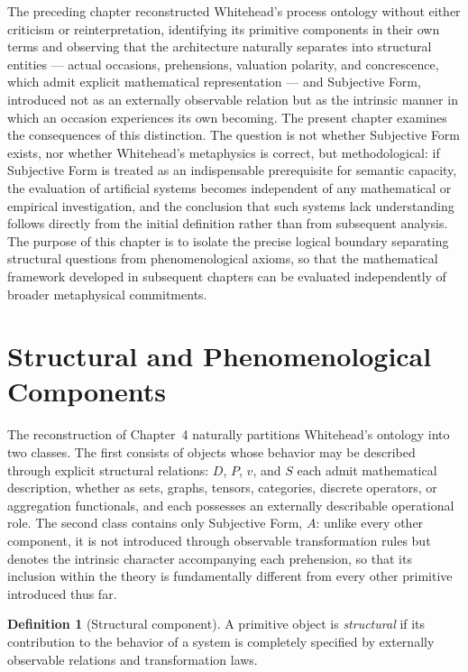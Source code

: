 \documentclass[11pt,twoside,openright]{book}
\numberwithin{equation}{chapter}
\theoremstyle{definition}
\newtheorem{definition}{Definition}[chapter]
\theoremstyle{plain}
\theoremstyle{remark}
\theoremstyle{definition}
\newcommand{\WData}{D}
\newcommand{\WPrehensions}{P}
\newcommand{\WValuation}{v}
\newcommand{\WSatisfaction}{S}
\newcommand{\WSubjForm}{A}
\begin{document}
The preceding chapter reconstructed Whitehead's process ontology without
either criticism or reinterpretation, identifying its primitive
components in their own terms and observing that the architecture
naturally separates into structural entities --- actual occasions,
prehensions, valuation polarity, and concrescence, which admit explicit
mathematical representation --- and Subjective Form, introduced not as an
externally observable relation but as the intrinsic manner in which an
occasion experiences its own becoming. The present chapter examines the
consequences of this distinction. The question is not whether Subjective
Form exists, nor whether Whitehead's metaphysics is correct, but
methodological: if Subjective Form is treated as an indispensable
prerequisite for semantic capacity, the evaluation of artificial systems
becomes independent of any mathematical or empirical investigation, and
the conclusion that such systems lack understanding follows directly from
the initial definition rather than from subsequent analysis. The purpose
of this chapter is to isolate the precise logical boundary separating
structural questions from phenomenological axioms, so that the
mathematical framework developed in subsequent chapters can be evaluated
independently of broader metaphysical commitments.

\section{Structural and Phenomenological Components}

The reconstruction of Chapter~4 naturally partitions Whitehead's ontology
into two classes. The first consists of objects whose behavior may be
described through explicit structural relations: $\WData$, $\WPrehensions$,
$\WValuation$, and $\WSatisfaction$ each admit mathematical description,
whether as sets, graphs, tensors, categories, discrete operators, or
aggregation functionals, and each possesses an externally describable
operational role. The second class contains only Subjective Form,
$\WSubjForm$: unlike every other component, it is not introduced through
observable transformation rules but denotes the intrinsic character
accompanying each prehension, so that its inclusion within the theory is
fundamentally different from every other primitive introduced thus far.

\begin{definition}[Structural component]
A primitive object is \emph{structural} if its contribution to the
behavior of a system is completely specified by externally observable
relations and transformation laws.
\end{definition}
\end{document}
